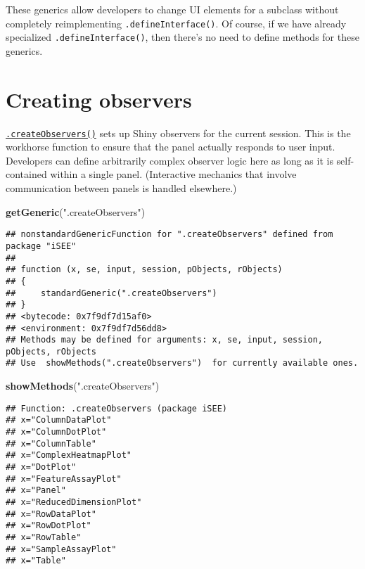 \documentclass[
]{book}
\newenvironment{Shaded}{\begin{snugshade}}{\end{snugshade}}
\newcommand{\KeywordTok}[1]{\textcolor[rgb]{0.13,0.29,0.53}{\textbf{#1}}}
\newcommand{\NormalTok}[1]{#1}
\newcommand{\StringTok}[1]{\textcolor[rgb]{0.31,0.60,0.02}{#1}}
\begin{document}
These generics allow developers to change UI elements for a subclass without completely reimplementing \texttt{.defineInterface()}.
Of course, if we have already specialized \texttt{.defineInterface()}, then there's no need to define methods for these generics.

\hypertarget{creating-observers}{%
\section{Creating observers}\label{creating-observers}}

\href{https://isee.github.io/iSEE/reference/observer-generics.html}{\texttt{.createObservers()}} sets up Shiny observers for the current session.
This is the workhorse function to ensure that the panel actually responds to user input.
Developers can define arbitrarily complex observer logic here as long as it is self-contained within a single panel.
(Interactive mechanics that involve communication between panels is handled elsewhere.)

\begin{Shaded}
\begin{Highlighting}[]
\KeywordTok{getGeneric}\NormalTok{(}\StringTok{".createObservers"}\NormalTok{)}
\end{Highlighting}
\end{Shaded}

\begin{verbatim}
## nonstandardGenericFunction for ".createObservers" defined from package "iSEE"
## 
## function (x, se, input, session, pObjects, rObjects) 
## {
##     standardGeneric(".createObservers")
## }
## <bytecode: 0x7f9df7d15af0>
## <environment: 0x7f9df7d56dd8>
## Methods may be defined for arguments: x, se, input, session, pObjects, rObjects
## Use  showMethods(".createObservers")  for currently available ones.
\end{verbatim}

\begin{Shaded}
\begin{Highlighting}[]
\KeywordTok{showMethods}\NormalTok{(}\StringTok{".createObservers"}\NormalTok{)}
\end{Highlighting}
\end{Shaded}

\begin{verbatim}
## Function: .createObservers (package iSEE)
## x="ColumnDataPlot"
## x="ColumnDotPlot"
## x="ColumnTable"
## x="ComplexHeatmapPlot"
## x="DotPlot"
## x="FeatureAssayPlot"
## x="Panel"
## x="ReducedDimensionPlot"
## x="RowDataPlot"
## x="RowDotPlot"
## x="RowTable"
## x="SampleAssayPlot"
## x="Table"
\end{verbatim}
\end{document}
